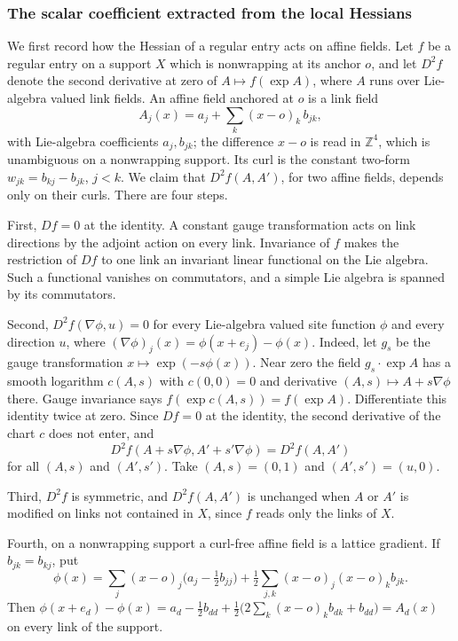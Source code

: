 \subsubsection{The scalar coefficient extracted from the local Hessians}
We first record how the Hessian of a regular entry acts on affine
fields. Let $f$ be a regular entry on a support $X$ which is
nonwrapping at its anchor $o$, and let $D^2f$ denote the second
derivative at zero of $A\mapsto f(\exp A)$, where $A$ runs over
Lie-algebra valued link fields. An affine field anchored at $o$ is
a link field
\[
 A_j(x)=a_j+\sum_k(x-o)_k\,b_{jk},
\]
with Lie-algebra coefficients $a_j,b_{jk}$; the difference $x-o$ is
read in $\mathbb Z^4$, which is unambiguous on a nonwrapping support.
Its curl is the constant two-form $w_{jk}=b_{kj}-b_{jk}$, $j<k$.
We claim that $D^2f(A,A')$, for two affine fields, depends only on
their curls. There are four steps.

First, $Df=0$ at the identity. A constant gauge transformation acts
on link directions by the adjoint action on every link. Invariance
of $f$ makes the restriction of $Df$ to one link an invariant linear
functional on the Lie algebra. Such a functional vanishes on
commutators, and a simple Lie algebra is spanned by its commutators.

Second, $D^2f(\nabla\phi,u)=0$ for every Lie-algebra valued site
function $\phi$ and every direction $u$, where
$(\nabla\phi)_j(x)=\phi(x+e_j)-\phi(x)$. Indeed, let $g_s$ be the
gauge transformation $x\mapsto\exp(-s\phi(x))$. Near zero the field
$g_s\cdot\exp A$ has a smooth logarithm $c(A,s)$ with $c(0,0)=0$ and
derivative $(A,s)\mapsto A+s\nabla\phi$ there. Gauge invariance
says $f(\exp c(A,s))=f(\exp A)$. Differentiate this identity twice
at zero. Since $Df=0$ at the identity, the second derivative of the
chart $c$ does not enter, and
\[
 D^2f(A+s\nabla\phi,A'+s'\nabla\phi)=D^2f(A,A')
\]
for all $(A,s)$ and $(A',s')$. Take $(A,s)=(0,1)$ and
$(A',s')=(u,0)$.

Third, $D^2f$ is symmetric, and $D^2f(A,A')$ is unchanged when $A$
or $A'$ is modified on links not contained in $X$, since $f$ reads
only the links of $X$.

Fourth, on a nonwrapping support a curl-free affine field is a
lattice gradient. If $b_{jk}=b_{kj}$, put
\[
 \phi(x)=\sum_j(x-o)_j\bigl(a_j-\tfrac12b_{jj}\bigr)
       +\tfrac12\sum_{j,k}(x-o)_j(x-o)_kb_{jk}.
\]
Then $\phi(x+e_d)-\phi(x)=a_d-\tfrac12b_{dd}
+\tfrac12\bigl(2\sum_k(x-o)_kb_{dk}+b_{dd}\bigr)=A_d(x)$ on every
link of the support.

